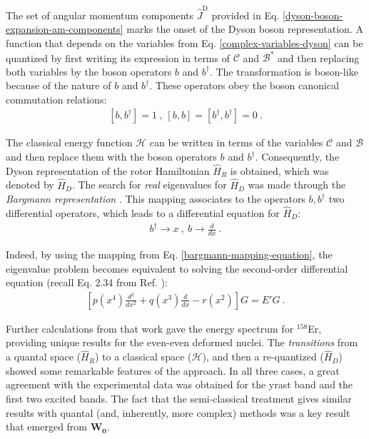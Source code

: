 The set of angular momentum components $\hat{J}^\text{D}$ provided in Eq. \ref{dyson-boson-expansion-am-components} marks the onset of the Dyson boson representation. A function that depends on the variables from Eq. \ref{complex-variables-dyson} can be quantized by first writing its expression in terms of $\mathcal{C}$ and $\mathcal{B}^*$ and then replacing both variables by the boson operators $b$ and $b^\dagger$. The transformation is boson-like because of the nature of $b$ and $b^\dagger$. These operators obey the boson canonical commutation relations:
\begin{align}
    \left[b,b^\dagger\right]=1\ ,\ \left[b,b\right]=\left[b^\dagger,b^\dagger\right]=0\ .
    \label{boson-commutation-relations}
\end{align}

The classical energy function $\mathcal{H}$ can be written in terms of the variables $\mathcal{C}$ and $\mathcal{B}$ and then replace them with the boson operators $b$ and $b^\dagger$. Consequently, the Dyson representation of the rotor Hamiltonian $\hat{H}_R$ is obtained, which was denoted by $\hat{H}_D$. The search for \emph{real} eigenvalues for $\hat{H}_D$ was made through the \emph{Bargmann representation} \cite{bargmann1962representations,jancovici1964collective,janssen1971boson}. This mapping associates to the operators $b,b^\dagger$ two differential operators, which leads to a differential equation for $\hat{H}_D$:
\begin{align}
    b^\dagger\rightarrow x\ ,\ b\rightarrow \frac{d}{dx}\ .
    \label{bargmann-mapping-equation}
\end{align}

Indeed, by using the mapping from Eq. \ref{bargmann-mapping-equation}, the eigenvalue problem becomes equivalent to solving the second-order differential equation (recall Eq. 2.34 from Ref. \cite{raduta2017semiclassical}):
\begin{align}
    \left[p(x^4)\frac{d^2}{dx^2}+q(x^3)\frac{d}{dx}-r(x^2)\right]G=E'G\ .
\end{align}

Further calculations from that work gave the energy spectrum for $^{158}$Er, providing unique results for the even-even deformed nuclei. The \emph{transitions} from a quantal space ($\hat{H}_R$) to a classical space ($\mathcal{H}$), and then a re-quantized ($\hat{H}_D$) showed some remarkable features of the approach. In all three cases, a great agreement with the experimental data was obtained for the yrast band and the first two excited bands. The fact that the semi-classical treatment gives similar results with quantal (and, inherently, more complex) methods was a key result that emerged from $\mathbf{W_0}$.

